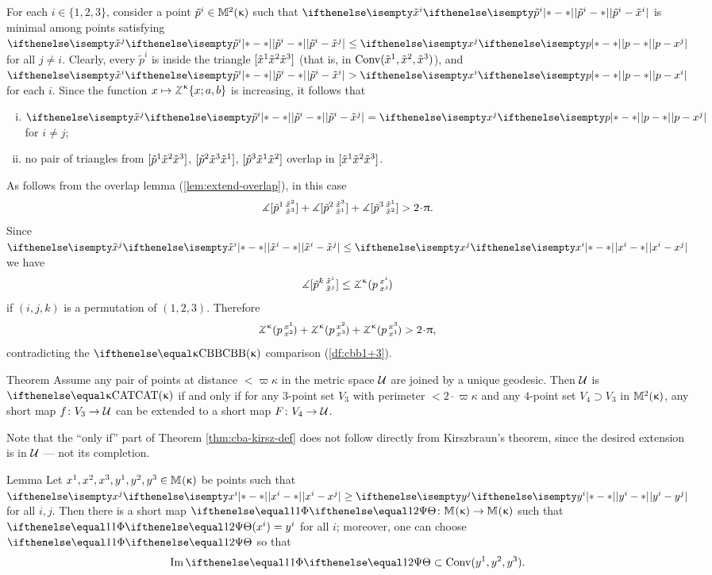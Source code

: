 For each $i\in \{1,2,3\}$, consider a point $\tilde p^i\in\Lob2\kappa$ such that $\dist{\tilde p^i}{\tilde x^i}{}$ is minimal among points satisfying $\dist{\tilde p^i}{\tilde x^j}{}\le\dist{p}{ x^j}{}$ for all $j\not=i$. 
Clearly, every $\tilde p^i$ is inside the triangle $[{\tilde x^1}{\tilde x^2}{\tilde x^3}]$ (that is, in $\mathop{\rm Conv}\nolimits(\tilde x^1,\tilde x^2,\tilde x^3)$), and $\dist{\tilde p^i}{\tilde x^i}{}>\dist{p}{ x^i}{}$ for each $i$.
Since the function $x\mapsto\tangle\mc\kappa\{x;a,b\}$
is increasing, it follows that
\begin{enumerate}[(i)]
\item $\dist{\tilde p^i}{\tilde x^j}{}=\dist{p}{ x^j}{}$ for $i\not=j$;
\item no pair of triangles from $[{\tilde p^1}{\tilde x^2}{\tilde x^3}]$, $[{\tilde p^2}{\tilde x^3}{\tilde x^1}]$, $[{\tilde p^3}{\tilde x^1}{\tilde x^2}]$ overlap in $[{\tilde x^1}{\tilde x^2}{\tilde x^3}]$.
\end{enumerate}

As follows from the overlap lemma (\ref{lem:extend-overlap}), 
in this case 
\[\mangle\hinge {\tilde p^1}{\tilde x^2}{\tilde x^3} 
+\mangle\hinge {\tilde p^2}{\tilde x^3}{\tilde x^1}
+\mangle\hinge {\tilde p^3}{\tilde x^1}{\tilde x^2}
>2\cdot\pi.
\]
Since $\dist{\tilde x^i}{\tilde x^j}{}\le\dist{x^i}{x^j}{}$ we have
\[\mangle\hinge {\tilde p^\kay}{\tilde x^i}{\tilde x^j}
\le
\angk\kappa p{x^i}{x^j}\]
if $(i,j,k)$ is a permutation of $(1,2,3)$.
Therefore 
\[\angk\kappa p{x^1}{x^2}+\angk\kappa p{x^2}{x^3}+\angk\kappa p{x^3}{x^1}>2\cdot\pi,\]
contradicting the $\Alex\kappa$ comparison (\ref{df:cbb1+3}).
\qeds

\begin{thm}{Theorem}\label{thm:cba-kirsz-def} 
Assume any pair of points at distance $<\varpi\kappa$ in the metric space $\mathcal{U}$ are joined by a unique geodesic. 
Then $\mathcal{U}$ is $\CAT\kappa$ if and only if 
for any $3$-point set $V_3$  with perimeter $<2\cdot\varpi\kappa$
and any $4$-point set $V_4\supset V_3$ in $\mathbb{M}_{{}}^{2}({\upkappa})$,
any short map $f\:V_3\to\spc{U}$ can be extended to a short map $F\:V_4\to\spc{U}$.
\end{thm}

Note that the ``only if'' part of Theorem \ref{thm:cba-kirsz-def} does not follow directly from Kirszbraun's theorem, since the desired extension is in $\mathcal{U}$ --- not its completion.

\begin{thm}{Lemma}\label{lem:smaller-trig}
Let $x^1,x^2,x^3,y^1,y^2,y^3\in\Lob{}{\kappa}$
be points such that $\dist{x^i}{x^j}{}\ge\dist{y^i}{y^j}{}$ for all $i,j$.
Then there is a short map $\map\:\Lob{}{\kappa}\to\Lob{}{\kappa}$ such that $\map(x^i)=y^i$ for all $i$;
moreover, one can choose $\map$ so that 
\[\Im \map\subset\Conv(y^1,y^2,y^3).\]

\end{thm}

